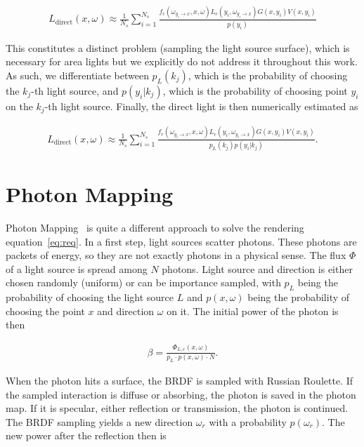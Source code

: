 \begin{align}
L_{\text{direct}}(x, \omega) \approx \frac{1}{N_s} \sum_{i=1}^{N_s} \frac{f_r(\omega_{y_i \rightarrow x}, x, \omega) L_e(y_i, \omega_{y_i \rightarrow x}) G(x,y_i)V(x,y_i)}{p(y_i)}
\end{align}

This constitutes a distinct problem (sampling the light source surface), which is necessary for area lights but we explicitly do not address it throughout this work. As such, we differentiate between $p_L(k_j)$, which is the probability of choosing the $k_j$-th light source, and $p(y_i|k_j)$, which is the probability of choosing point $y_i$ on the $k_j$-th light source. Finally, the direct light is then numerically estimated as

\begin{align}
L_{\text{direct}}(x, \omega) \approx \frac{1}{N_s} \sum_{i=1}^{N_s} \frac{f_r(\omega_{y_i \rightarrow x}, x, \omega) L_e(y_i, \omega_{y_i \rightarrow x}) G(x,y_i)V(x,y_i)}{p_L(k_j)p(y_i|k_j)}.
\end{align}


\section{Photon Mapping}
\label{sec:PM}
Photon Mapping~\parencite{jensen2001realistic, DBLP:journals/cg/JensenC95} is quite a different approach to solve the rendering equation~\ref{eq:req}. In a first step, light sources scatter photons. These photons are packets of energy, so they are not exactly photons in a physical sense. The flux $\Phi$ of a light source is spread among $N$ photons. Light source and direction is either chosen randomly (uniform) or can be importance sampled, with $p_L$ being the probability of choosing the light source $L$ and $p(x,\omega)$ being the probability of choosing the point $x$ and direction $\omega$ on it. The initial power of the photon is then

\begin{align}
\beta = \frac{\Phi_{L,e}(x,\omega)}{p_L \cdot p(x,\omega) \cdot N}.
\end{align}

When the photon hits a surface, the BRDF is sampled with Russian Roulette. If the sampled interaction is diffuse or absorbing, the photon is saved in the photon map. If it is specular, either reflection or transmission, the photon is continued. The BRDF sampling yields a new direction $\omega_r$ with a probability $p(\omega_r)$. The new power after the reflection then is

